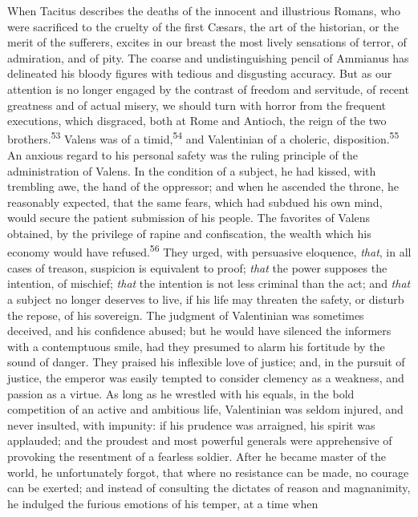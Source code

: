 {{{{{{{{{{{{{{{{{{{{{{{{{{{{{{{{{{{{{{{{{{{{{{{{{{{{{{{{{When Tacitus describes the deaths of the innocent and illustrious
Romans, who were sacrificed to the cruelty of the first Cæsars,
the art of the historian, or the merit of the sufferers, excites
in our breast the most lively sensations of terror, of
admiration, and of pity. The coarse and undistinguishing pencil
of Ammianus has delineated his bloody figures with tedious and
disgusting accuracy. But as our attention is no longer engaged by
the contrast of freedom and servitude, of recent greatness and of
actual misery, we should turn with horror from the frequent
executions, which disgraced, both at Rome and Antioch, the reign
of the two brothers.\textsuperscript{53} Valens was of a timid,\textsuperscript{54} and Valentinian
of a choleric, disposition.\textsuperscript{55} An anxious regard to his personal
safety was the ruling principle of the administration of Valens.
In the condition of a subject, he had kissed, with trembling awe,
the hand of the oppressor; and when he ascended the throne, he
reasonably expected, that the same fears, which had subdued his
own mind, would secure the patient submission of his people. The
favorites of Valens obtained, by the privilege of rapine and
confiscation, the wealth which his economy would have refused.\textsuperscript{56}
They urged, with persuasive eloquence, \textit{that}, in all cases of
treason, suspicion is equivalent to proof; \textit{that} the power
supposes the intention, of mischief; \textit{that} the intention is not
less criminal than the act; and \textit{that} a subject no longer
deserves to live, if his life may threaten the safety, or disturb
the repose, of his sovereign. The judgment of Valentinian was
sometimes deceived, and his confidence abused; but he would have
silenced the informers with a contemptuous smile, had they
presumed to alarm his fortitude by the sound of danger. They
praised his inflexible love of justice; and, in the pursuit of
justice, the emperor was easily tempted to consider clemency as a
weakness, and passion as a virtue. As long as he wrestled with
his equals, in the bold competition of an active and ambitious
life, Valentinian was seldom injured, and never insulted, with
impunity: if his prudence was arraigned, his spirit was
applauded; and the proudest and most powerful generals were
apprehensive of provoking the resentment of a fearless soldier.
After he became master of the world, he unfortunately forgot,
that where no resistance can be made, no courage can be exerted;
and instead of consulting the dictates of reason and magnanimity,
he indulged the furious emotions of his temper, at a time when
}}}}}}}}}}}}}}}}}}}}}}}}}}}}}}}}}}}}}}}}}}}}}}}}}}}}}}}}}
